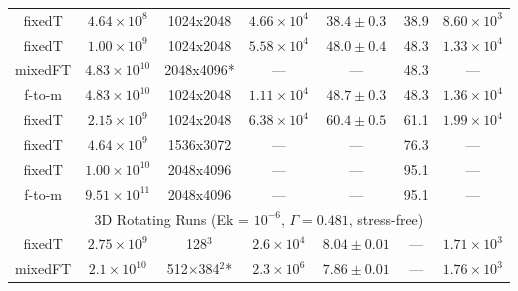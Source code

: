 \documentclass[aps, pre, onecolumn, nofootinbib, notitlepage, groupedaddress, amsfonts, amssymb, amsmath, longbibliography, superscriptaddress]{revtex4-1}
\begin{document}
\begin{table}[ht]
\begin{center}
\begin{tabularx}{\textwidth}{c c c c c c c}
fixedT	&	$4.64 \times 10^8$		&	1024x2048	&	$4.66 \times 10^4$	&	$38.4 \pm 0.3$	&	38.9	&	$8.60 \times 10^3$ \\
fixedT	&	$1.00 \times 10^9$		&	1024x2048	&	$5.58 \times 10^4$	&	$48.0 \pm 0.4$	&	48.3	&	$1.33 \times 10^4$ \\
mixedFT	&	$4.83 \times 10^{10}$	&	2048x4096*	&	---					&	---				&	48.3	&	--- \\
f-to-m	&	$4.83 \times 10^{10}$	&	1024x2048	&	$1.11 \times 10^4$	&	$48.7 \pm 0.3$	&	48.3	&	$1.36 \times 10^4$ \\
fixedT	&	$2.15 \times 10^9$		&	1024x2048	&	$6.38 \times 10^4$	&	$60.4 \pm 0.5$	&	61.1	&	$1.99 \times 10^4$ \\
fixedT	&	$4.64 \times 10^9$		&	1536x3072	&	---					&	---				&	76.3	&	--- \\
fixedT	&	$1.00 \times 10^{10}$	&	2048x4096	&	---					&	---				&	95.1	&	--- \\
f-to-m	&	$9.51 \times 10^{11}$	&	2048x4096	&	---					&	---				&	95.1	&	--- \\
\hline																	
\multicolumn{7}{c}{\vspace{0.1cm}3D Rotating Runs (Ek = $10^{-6}$, $\Gamma = 0.481$, stress-free)} \\
\hline																	
fixedT	&	$2.75 \times 10^9$		&	128$^3$				&	$2.6 \times 10^4$	&	$8.04 \pm 0.01$	&	---		&	$1.71 \times 10^3$ \\
mixedFT	&	$2.1 \times 10^{10}$	&	512$\times$384$^2$*	&	$2.3 \times 10^6$	&	$7.86 \pm 0.01$	&	---		&	$1.76 \times 10^3$ \\
\hline																	
\end{tabularx}
\end{center}
\end{table}
\end{document}
